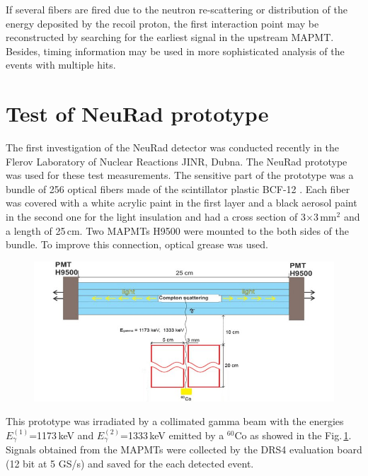 \documentclass{webofc}
\begin{document}
If several fibers are fired due to the neutron re-scattering or distribution of the energy deposited by the recoil proton, the first interaction point may be reconstructed by searching for the earliest signal in the upstream MAPMT. Besides, timing information may be used in more sophisticated analysis of the events with multiple hits.

\section{Test of NeuRad prototype}

The first investigation of the NeuRad detector was conducted recently in the Flerov Laboratory of Nuclear Reactions JINR, Dubna. The NeuRad prototype was used for these test measurements. The sensitive part of the prototype was a bundle of 256 optical fibers made of the scintillator plastic BCF-12 \cite{crystals}. 
Each fiber was covered with a white acrylic paint in the first layer and a black aerosol paint in the second one for the light insulation and had a cross section of 3$\times$3\,mm$^2$ and a length of 25\,cm. Two MAPMTs H9500 \cite{hm} were mounted to the both sides of the bundle. To improve this connection, optical grease was used.

\begin{figure}[h]
	\centering
	\includegraphics[width=0.7\linewidth]{NeuRadexperiment.png}
\label{ris:neuradexp}
\end{figure}

This prototype was irradiated by a collimated gamma beam with the energies $E^{(1)}_{\gamma}$=1173\,keV and $E^{(2)}_{\gamma}$=1333\,keV emitted by a $^{60}$Co as showed in the Fig.\,\ref{ris:neuradexp}. Signals obtained from the MAPMTs were collected by the DRS4 evaluation board \cite{DRS} (12 bit at 5 GS/s) and saved for the each detected event.
\end{document}
